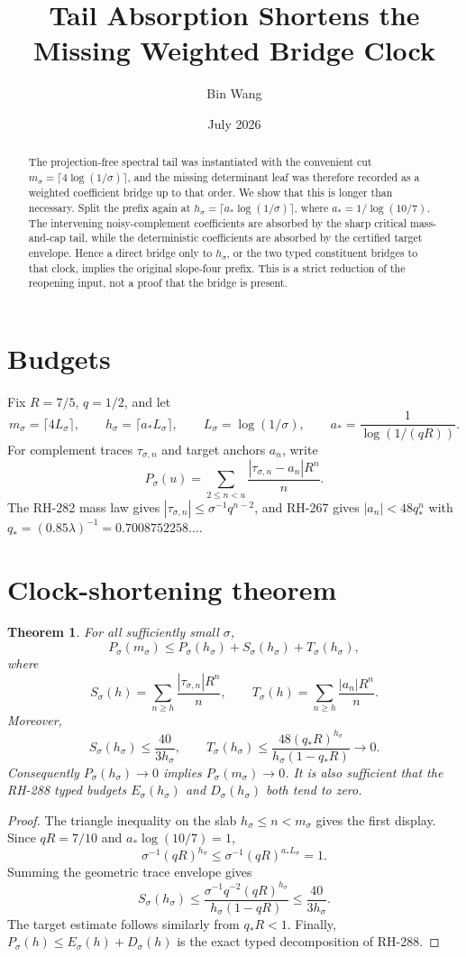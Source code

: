 \documentclass[11pt]{article}
\title{Tail Absorption Shortens the Missing Weighted Bridge Clock}
\author{Bin Wang}\date{July 2026}
\newtheorem{theorem}{Theorem}[section]
\theoremstyle{remark}\newtheorem{remark}[theorem]{Remark}
\begin{document}
\maketitle
\begin{abstract}
The projection-free spectral tail was instantiated with the convenient cut
$m_\sigma=\lceil4\log(1/\sigma)\rceil$, and the missing determinant leaf was
therefore recorded as a weighted coefficient bridge up to that order.  We
show that this is longer than necessary.  Split the prefix again at
$h_\sigma=\lceil a_*\log(1/\sigma)\rceil$, where
$a_*=1/\log(10/7)$.  The intervening noisy-complement coefficients are
absorbed by the sharp critical mass-and-cap tail, while the deterministic
coefficients are absorbed by the certified target envelope.  Hence a direct
bridge only to $h_\sigma$, or the two typed constituent bridges to that
clock, implies the original slope-four prefix.  This is a strict reduction
of the reopening input, not a proof that the bridge is present.
\end{abstract}

\section{Budgets}
Fix $R=7/5$, $q=1/2$, and let
\[
 m_\sigma=\lceil4L_\sigma\rceil,\qquad
 h_\sigma=\lceil a_*L_\sigma\rceil,\qquad
 L_\sigma=\log(1/\sigma),\qquad
 a_*=\frac1{\log(1/(qR))}.
\]
For complement traces $\tau_{\sigma,n}$ and target anchors $a_n$, write
\[
 P_\sigma(u)=\sum_{2\le n<u}
 \frac{|\tau_{\sigma,n}-a_n|R^n}{n}.
\]
The RH-282 mass law gives
$|\tau_{\sigma,n}|\le\sigma^{-1}q^{n-2}$, and RH-267 gives
$|a_n|<48q_*^n$ with
$q_*=(0.85\lambda)^{-1}=0.7008752258\ldots$.

\section{Clock-shortening theorem}
\begin{theorem}\label{thm:shorten}
For all sufficiently small $\sigma$,
\[
 P_\sigma(m_\sigma)\le P_\sigma(h_\sigma)
+S_\sigma(h_\sigma)+T_\sigma(h_\sigma),
\]
where
\[
 S_\sigma(h)=\sum_{n\ge h}\frac{|\tau_{\sigma,n}|R^n}{n},
\qquad
 T_\sigma(h)=\sum_{n\ge h}\frac{|a_n|R^n}{n}.
\]
Moreover,
\[
 S_\sigma(h_\sigma)\le
 \frac{40}{3h_\sigma},\qquad
 T_\sigma(h_\sigma)\le
 \frac{48(q_*R)^{h_\sigma}}{h_\sigma(1-q_*R)}
 \longrightarrow0.
\]
Consequently $P_\sigma(h_\sigma)\to0$ implies
$P_\sigma(m_\sigma)\to0$.  It is also sufficient that the RH-288 typed
budgets $E_\sigma(h_\sigma)$ and $D_\sigma(h_\sigma)$ both tend to zero.
\end{theorem}
\begin{proof}
The triangle inequality on the slab $h_\sigma\le n<m_\sigma$ gives the first
display.  Since $qR=7/10$ and
$a_*\log(10/7)=1$,
\[
 \sigma^{-1}(qR)^{h_\sigma}
 \le \sigma^{-1}(qR)^{a_*L_\sigma}=1.
\]
Summing the geometric trace envelope gives
\[
 S_\sigma(h_\sigma)
 \le\frac{\sigma^{-1}q^{-2}(qR)^{h_\sigma}}
 {h_\sigma(1-qR)}
 \le\frac{40}{3h_\sigma}.
\]
The target estimate follows similarly from $q_*R<1$.  Finally,
$P_\sigma(h)\le E_\sigma(h)+D_\sigma(h)$ is the exact typed decomposition
of RH-288.
\end{proof}
\end{document}
